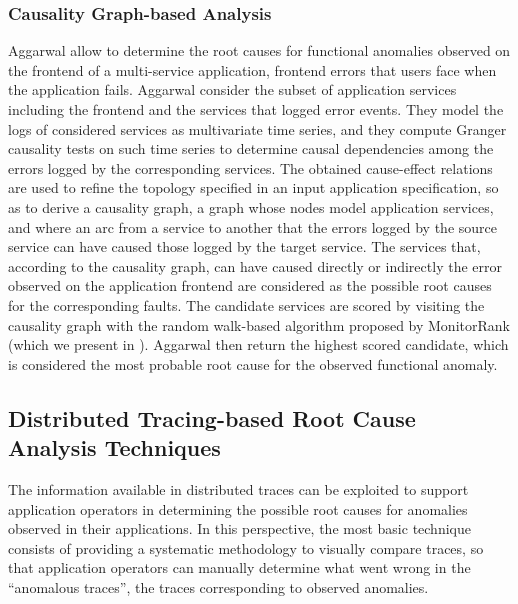 \subsubsection{{Causality Graph-based Analysis}}
Aggarwal \etal \cite{10_Aggarwal2020_FaultsGoldenSignals} allow to determine the root causes for functional anomalies observed on the frontend of a multi-service application, \viz frontend errors that users face when the application fails.
Aggarwal \etal \cite{10_Aggarwal2020_FaultsGoldenSignals} consider the subset of application services including the frontend and the services that logged error events.
They model the logs of considered services as multivariate time series, and they compute Granger causality tests \cite{Arnold2007_GrangerMethodsTemporalCausalModelling} on such time series to determine %
causal dependencies among the errors logged by the corresponding services.
The obtained cause-effect relations are used to refine the topology specified in an input application specification, so as to derive a causality graph, \viz a graph whose nodes model application services, and where an arc from a service to another that the errors logged by the source service can have caused those logged by the target service.
The services that, according to the causality graph, can have caused directly or indirectly the error observed on the application frontend are considered as the possible root causes for the corresponding faults.
The candidate services are scored by visiting the causality graph with the random walk-based algorithm proposed by MonitorRank \cite{21_Kim2013_RootCauseDetectionSOA} (which we present in ).
Aggarwal \etal \cite{10_Aggarwal2020_FaultsGoldenSignals} then return the highest scored candidate, which is considered the most probable root cause for the observed functional anomaly.

\subsection{Distributed Tracing-based Root Cause Analysis Techniques}
\label{sec:rca:distributed-tracing}
The information available in distributed traces can be exploited to support application operators in determining the possible root causes for anomalies observed in their applications.
In this perspective, the most basic technique consists of providing a systematic methodology to visually compare traces, so that application operators can manually determine what went wrong in the \enquote{anomalous traces}, \viz the traces corresponding to observed anomalies.


